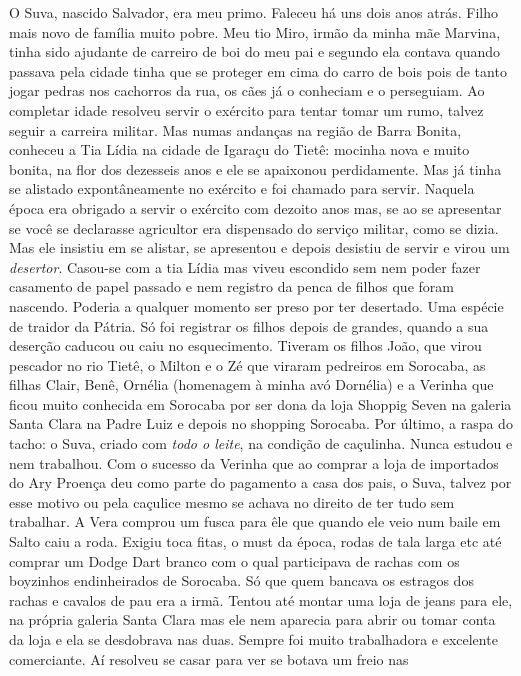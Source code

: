 \documentclass[12pt,brazil,]{book}
\begin{document}
O Suva, nascido Salvador, era meu primo. Faleceu há uns dois anos atrás.
Filho mais novo de família muito pobre. Meu tio Miro, irmão da minha mãe
Marvina, tinha sido ajudante de carreiro de boi do meu pai e segundo ela
contava quando passava pela cidade tinha que se proteger em cima do
carro de bois pois de tanto jogar pedras nos cachorros da rua, os cães
já o conheciam e o perseguiam. Ao completar idade resolveu servir o
exército para tentar tomar um rumo, talvez seguir a carreira militar.
Mas numas andanças na região de Barra Bonita, conheceu a Tia Lídia na
cidade de Igaraçu do Tietê: mocinha nova e muito bonita, na flor dos
dezesseis anos e ele se apaixonou perdidamente. Mas já tinha se alistado
expontâneamente no exército e foi chamado para servir. Naquela época era
obrigado a servir o exército com dezoito anos mas, se ao se apresentar
se você se declarasse agricultor era dispensado do serviço militar, como
se dizia. Mas ele insistiu em se alistar, se apresentou e depois
desistiu de servir e virou um \emph{desertor}. Casou-se com a tia Lídia
mas viveu escondido sem nem poder fazer casamento de papel passado e nem
registro da penca de filhos que foram nascendo. Poderia a qualquer
momento ser preso por ter desertado. Uma espécie de traidor da Pátria.
Só foi registrar os filhos depois de grandes, quando a sua deserção
caducou ou caiu no esquecimento. Tiveram os filhos João, que virou
pescador no rio Tietê, o Milton e o Zé que viraram pedreiros em
Sorocaba, as filhas Clair, Benê, Ornélia (homenagem à minha avó
Dornélia) e a Verinha que ficou muito conhecida em Sorocaba por ser dona
da loja Shoppig Seven na galeria Santa Clara na Padre Luiz e depois no
shopping Sorocaba. Por último, a raspa do tacho: o Suva, criado com
\emph{todo o leite}, na condição de caçulinha. Nunca estudou e nem
trabalhou. Com o sucesso da Verinha que ao comprar a loja de importados
do Ary Proença deu como parte do pagamento a casa dos pais, o Suva,
talvez por esse motivo ou pela caçulice mesmo se achava no direito de
ter tudo sem trabalhar. A Vera comprou um fusca para êle que quando ele
veio num baile em Salto caiu a roda. Exigiu toca fitas, o must da época,
rodas de tala larga etc até comprar um Dodge Dart branco com o qual
participava de rachas com os boyzinhos endinheirados de Sorocaba. Só que
quem bancava os estragos dos rachas e cavalos de pau era a irmã. Tentou
até montar uma loja de jeans para ele, na própria galeria Santa Clara
mas ele nem aparecia para abrir ou tomar conta da loja e ela se
desdobrava nas duas. Sempre foi muito trabalhadora e excelente
comerciante. Aí resolveu se casar para ver se botava um freio nas
\end{document}
